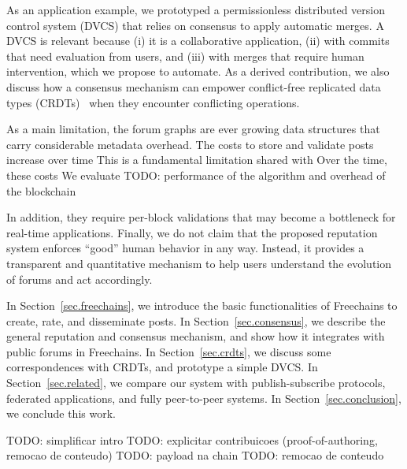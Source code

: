 \documentclass[10pt,journal,compsoc]{IEEEtran}
\newcommand{\FC}       {Freechains\xspace}
\begin{document}
As an application example, we prototyped a permissionless distributed version
control system (DVCS) that relies on consensus to apply automatic merges.
A DVCS is relevant because
    (i)   it is a collaborative application,
    (ii)  with commits that need evaluation from users, and
    (iii) with merges that require human intervention, which we propose to
          automate.
%
As a derived contribution, we also discuss how a consensus mechanism can
empower conflict-free replicated data types (CRDTs)~\cite{p2p.merkle-crdts}
when they encounter conflicting operations.

As a main limitation, the forum graphs are ever growing data structures that
carry considerable metadata overhead.
The costs to store and validate posts increase over time
This is a fundamental limitation shared with 
Over the time, these costs
We evaluate
TODO: performance of the algorithm and overhead of the blockchain

In addition, they require per-block validations that may become a bottleneck
for real-time applications.
%
Finally, we do not claim that the proposed reputation system enforces ``good''
human behavior in any way.
Instead, it provides a transparent and quantitative mechanism to help users
understand the evolution of forums and act accordingly.

In Section~\ref{sec.freechains}, we introduce the basic functionalities of \FC
to create, rate, and disseminate posts.
In Section~\ref{sec.consensus}, we describe the general reputation and
consensus mechanism, and show how it integrates with public forums in \FC.
In Section~\ref{sec.crdts}, we discuss some correspondences with
CRDTs, and prototype a simple DVCS.
In Section~\ref{sec.related}, we compare our system with publish-subscribe
protocols, federated applications, and fully peer-to-peer systems.
In Section~\ref{sec.conclusion}, we conclude this work.

TODO: simplificar intro
TODO: explicitar contribuicoes (proof-of-authoring, remocao de conteudo)
TODO: payload na chain
TODO: remocao de conteudo
\end{document}
